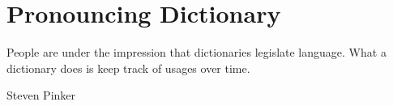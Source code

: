 \chapter{Pronouncing Dictionary}
\epigraph{People are under the impression that dictionaries legislate language. What a dictionary does is keep track of usages over time.}{Steven Pinker}

%
%
%
%
%
%

